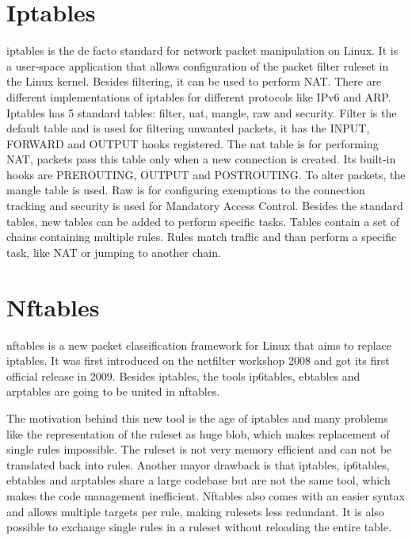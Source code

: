 \documentclass{report}
\begin{document}
\section{Iptables}\label{iptables}

iptables\cite{iptables} is the de facto standard for network packet manipulation on
Linux. It is a user-space application that allows configuration of
the packet filter ruleset in the Linux kernel. Besides filtering, it can
be used to perform NAT. There are different implementations of iptables
for different protocols like IPv6 and ARP. Iptables has 5 standard
tables: filter, nat, mangle, raw and security. Filter is the default
table and is used for filtering unwanted packets, it has the INPUT,
FORWARD and OUTPUT hooks registered. The nat table is for performing
NAT, packets pass this table only when a new connection is created. Its built-in
hooks are PREROUTING, OUTPUT and POSTROUTING. To alter
packets, the mangle table is used. Raw is for configuring exemptions to
the connection tracking and security is used for Mandatory Access
Control. Besides the standard tables, new tables can be added to perform
specific tasks. Tables contain a set of chains containing multiple rules.
Rules match traffic and than perform a specific task, like NAT or
jumping to another chain.

\section{Nftables}\label{nftables}

nftables\cite{nftables}\cite{nftables2}\cite{nftables3} is a new packet classification framework for Linux that aims to
replace iptables. It was first introduced on the netfilter workshop 2008
and got its first official release in 2009. Besides iptables, the tools
ip6tables, ebtables and arptables are going to be united in nftables.

The motivation behind this new tool is the age of iptables and many
problems like the representation of the ruleset as huge blob, which
makes replacement of single rules impossible. The ruleset is not very
memory efficient and can not be translated back into rules. Another
mayor drawback is that iptables, ip6tables, ebtables and arptables share
a large codebase but are not the same tool, which makes the code
management inefficient. Nftables also comes with an easier syntax and
allows multiple targets per rule, making rulesets less redundant. It is
also possible to exchange single rules in a ruleset without reloading
the entire table.
\end{document}
